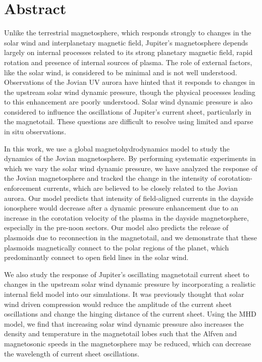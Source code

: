 \chapter{Abstract}

Unlike the terrestrial magnetosphere, which responds strongly to changes in the solar wind and interplanetary magnetic field, Jupiter's magnetosphere depends largely on internal processes related to its strong planetary magnetic field, rapid rotation and presence of internal sources of plasma. The role of external factors, like the solar wind, is considered to be minimal and is not well understood. Observations of the Jovian UV aurora have hinted that it responds to changes in the upstream solar wind dynamic pressure, though the physical processes leading to this enhancement are poorly understood. Solar wind dynamic pressure is also considered to influence the oscillations of Jupiter's current sheet, particularly in the magnetotail. These questions are difficult to resolve using limited and sparse in situ observations. 

In this work, we use a global magnetohydrodynamics model to study the dynamics of the Jovian magnetosphere. By performing systematic experiments in which we vary the solar wind dynamic pressure, we have analyzed the response of the Jovian magnetosphere and tracked the change in the intensity of corotation-enforcement currents, which are believed to be closely related to the Jovian aurora. Our model predicts that intensity of field-aligned currents in the dayside ionosphere would decrease after a dynamic pressure enhancement due to an increase in the corotation velocity of the plasma in the dayside magnetosphere, especially in the pre-noon sectors. Our model also predicts the release of plasmoids due to reconnection in the magnetotail, and we demonstrate that these plasmoids magnetically connect to the polar regions of the planet, which predominantly connect to open field lines in the solar wind. 

We also study the response of Jupiter's oscillating magnetotail current sheet to changes in the upstream solar wind dynamic pressure by incorporating a realistic internal field model into our simulations. It was previously thought that solar wind driven compression would reduce the amplitude of the current sheet oscillations and change the hinging distance of the current sheet. Using the MHD model, we find that increasing solar wind dynamic pressure also increases the density and temperature in the magnetotail lobes such that the Alfven and magnetosonic speeds in the magnetosphere may be reduced, which can decrease the wavelength of current sheet oscillations.

